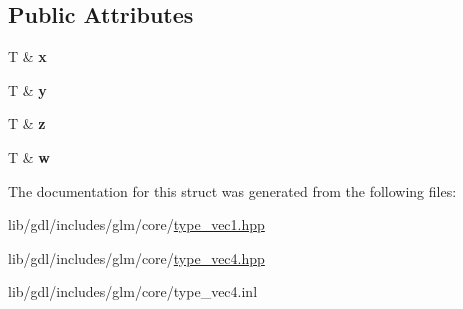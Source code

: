 \subsection*{Public Attributes}
\begin{DoxyCompactItemize}
\item 
\hypertarget{structglm_1_1detail_1_1tref4_ab32630a2702b20d2c40cda8e2f656908}{}T \& {\bfseries x}\label{structglm_1_1detail_1_1tref4_ab32630a2702b20d2c40cda8e2f656908}

\item 
\hypertarget{structglm_1_1detail_1_1tref4_a6aa739c6a296a62be6affef3a364873a}{}T \& {\bfseries y}\label{structglm_1_1detail_1_1tref4_a6aa739c6a296a62be6affef3a364873a}

\item 
\hypertarget{structglm_1_1detail_1_1tref4_ac87b56230150da4d731b70dc1bafaccc}{}T \& {\bfseries z}\label{structglm_1_1detail_1_1tref4_ac87b56230150da4d731b70dc1bafaccc}

\item 
\hypertarget{structglm_1_1detail_1_1tref4_a697261241694b19906b807f17ed71582}{}T \& {\bfseries w}\label{structglm_1_1detail_1_1tref4_a697261241694b19906b807f17ed71582}

\end{DoxyCompactItemize}


The documentation for this struct was generated from the following files\+:\begin{DoxyCompactItemize}
\item 
lib/gdl/includes/glm/core/\hyperlink{type__vec1_8hpp}{type\+\_\+vec1.\+hpp}\item 
lib/gdl/includes/glm/core/\hyperlink{type__vec4_8hpp}{type\+\_\+vec4.\+hpp}\item 
lib/gdl/includes/glm/core/type\+\_\+vec4.\+inl\end{DoxyCompactItemize}
